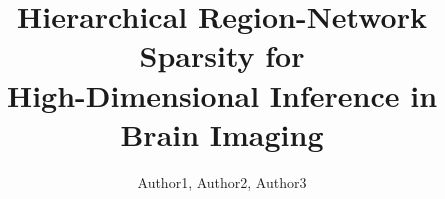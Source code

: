 \documentclass[runningheads,a4paper]{llncs}
\begin{document}
\mainmatter  %

\title{Hierarchical Region-Network Sparsity for\\
High-Dimensional Inference in Brain Imaging}


%
%


\author{Author1, Author2, Author3}


%


%
%
\end{document}
